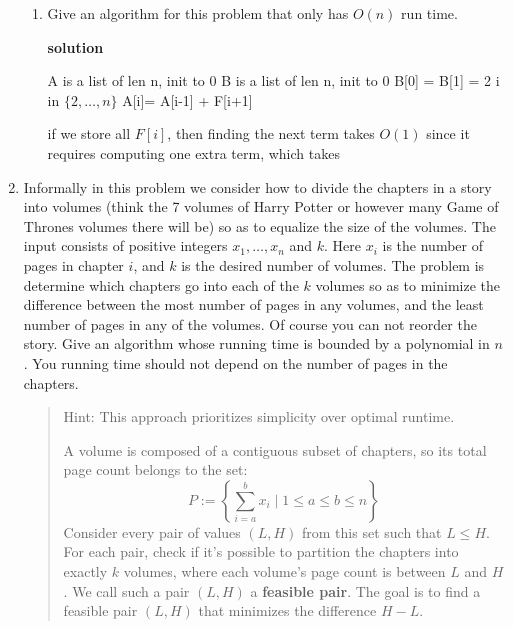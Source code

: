 \documentclass[letterpaper,12pt]{article}
\begin{document}
\begin{enumerate}
\begin{enumerate}
\item
Give an algorithm for this problem that only has $O(n)$ 
run time. 

\textbf{solution}

\begin{algorithmic}
    \State A is a list of len n, init to 0
    \State B is a list of len n, init to 0
    \State B[0] = B[1] = 2 
    \For i in \(\{2,\dots,n\}\)
        A[i]= A[i-1] + F[i+1]
    \EndFor
\end{algorithmic}



if we store all \(F[i]\), then finding the next term takes \(O(1)\) since it requires computing one extra term, which takes 



\end{enumerate}



\item Informally in this problem we consider how to divide the chapters in a story into volumes (think the 7 volumes of Harry Potter
or however many Game of Thrones volumes there will be) so as to equalize the size of the volumes. 
The input consists of positive integers $x_1, \ldots, x_n$ and $k$. Here $x_i$ is the number of pages in chapter $i$, and $k$ is the desired number of volumes. The problem is determine which chapters go
into each of the $k$ volumes so as to minimize the difference between the most number of pages in
any volumes, and the least number of pages in any of the volumes. Of course you can not reorder the story. 
Give an algorithm whose running time is bounded by a  polynomial in $n$. You running time should not
depend on the number of pages in the chapters. 


\smallskip
\begin{quote}
Hint: This approach prioritizes simplicity over optimal runtime.

A volume is composed of a contiguous subset of chapters, so its total page count belongs to the set:
\[
P := \left\{ \sum_{i=a}^{b} x_i \mid 1 \le a \le b \le n \right\}
\]
Consider every pair of values $(L, H)$ from this set such that $L \le H$. For each pair, check if it's possible to partition the chapters into exactly $k$ volumes, where each volume's page count is between $L$ and $H$. We call such a pair $(L, H)$ a \textbf{feasible pair}. The goal is to find a feasible pair $(L, H)$ that minimizes the difference $H-L$. 

\end{quote}


\end{enumerate}
\end{document}
